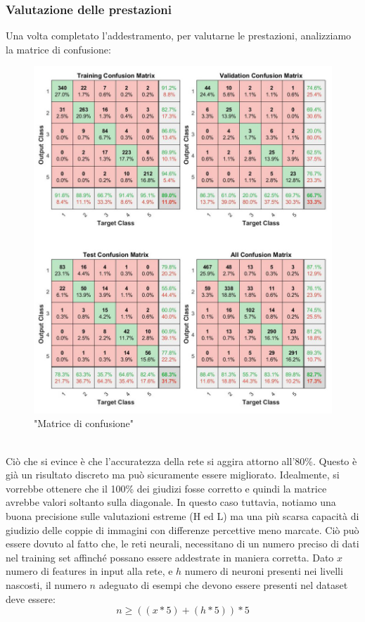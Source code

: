 \documentclass[a4paper,11pt]{article}
\begin{document}
    \subsubsection{Valutazione delle prestazioni}
    Una volta completato l'addestramento, per valutarne le prestazioni, analizziamo la matrice di confusione:
    \begin{figure}[h]
        \centering
        \includegraphics[scale=0.38]{confusion1}
        \caption{"Matrice di confusione"}
    \end{figure}
    \\Ciò che si evince è che l'accuratezza della rete si aggira attorno all'80\%. Questo è già un risultato discreto ma può sicuramente essere migliorato. Idealmente, si vorrebbe ottenere che il 100\% dei giudizi fosse corretto e quindi
    la matrice avrebbe valori soltanto sulla diagonale. In questo caso tuttavia, notiamo una buona precisione sulle valutazioni estreme (H ed L) ma una più scarsa capacità di giudizio delle coppie di immagini con differenze percettive meno marcate.
    Ciò può essere dovuto al fatto che, le reti neurali, necessitano di un numero preciso di dati nel training set affinché possano essere addestrate in maniera corretta.
    Dato $x$ numero di features in input alla rete, e $h$ numero di neuroni presenti nei livelli nascosti, il numero $n$ adeguato di esempi che devono essere presenti nel dataset deve essere:
    $$ n \geq ((x*5)+(h*5))*5 $$
\end{document}
